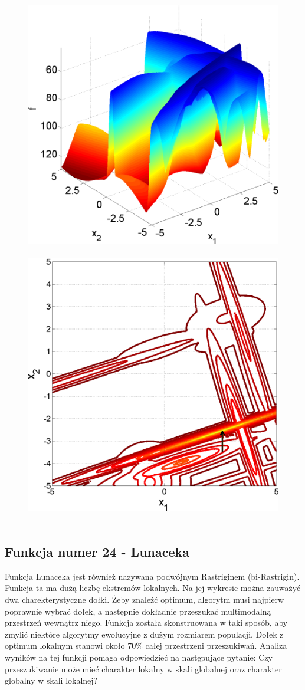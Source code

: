 \documentclass[a4paper,onecolumn,oneside,11pt,wide,floatssmall]{mwrep}
\theoremstyle{definition}
\theoremstyle{plain}%
\theoremstyle{remark}
\begin{document}
\begin{figure}[H]
\centering
\mbox{
\includegraphics[width=.45\textwidth]{img/22.png} \quad
\includegraphics[width=.45\textwidth]{img/22a.png} 
}
\end{figure}

\subsection{Funkcja numer 24 - Lunaceka}

Funkcja Lunaceka jest również nazywana podwójnym Rastriginem (bi-Rastrigin). Funkcja ta ma dużą liczbę ekstremów lokalnych. 
Na jej wykresie można zauważyć dwa charekterystyczne dołki. Żeby znaleźć optimum, algorytm musi najpierw poprawnie wybrać dołek,
a następnie dokładnie przeszukać multimodalną przestrzeń wewnątrz niego. Funkcja została skonstruowana w taki sposób, aby zmylić
niektóre algorytmy ewolucyjne z dużym rozmiarem populacji. Dołek z optimum lokalnym stanowi około 70\% całej przestrzeni przeszukiwań.
Analiza wyników na tej funkcji pomaga odpowiedzieć na następujące pytanie:
Czy przeszukiwanie może mieć charakter lokalny w skali globalnej oraz charakter globalny w skali lokalnej?
\end{document}
